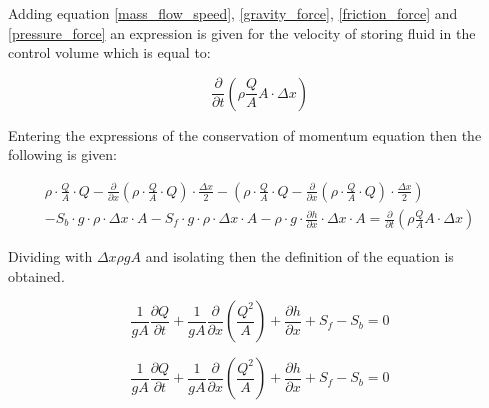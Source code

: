 Adding equation \ref{mass_flow_speed}, \ref{gravity_force}, \ref{friction_force} and \ref{pressure_force} an expression is given for the velocity of storing fluid in the control volume which is equal to:

\begin{equation}
\frac{\partial}{\partial t} (\rho \frac{Q}{A}A\cdot \Delta x)
\end{equation}

Entering the expressions of the conservation of momentum equation then the following is given:

\begin{equation}
\begin{array}{l}
\rho \cdot \frac{Q}{A} \cdot Q - \frac{\partial}{\partial x}(\rho \cdot \frac{Q}{A}  \cdot Q) \cdot \frac{\Delta x}{2} - \left(\rho \cdot \frac{Q}{A}  \cdot Q - \frac{\partial}{\partial x}(\rho \cdot \frac{Q}{A}  \cdot Q) \cdot \frac{\Delta x}{2} \right)\\
-S_b \cdot g \cdot \rho \cdot \Delta x \cdot A -S_f \cdot g \cdot \rho \cdot \Delta x \cdot A  -\rho\cdot g \cdot \frac{\partial h}{\partial x} \cdot \Delta x \cdot A =\frac{\partial}{\partial t} (\rho \frac{Q}{A}A\cdot \Delta x)
\end{array}
\end{equation}

Dividing with $\Delta x \rho g A$ and isolating then the definition of the equation is obtained.

\begin{equation}
\frac{1}{gA} \frac{\partial Q}{\partial t} +\frac{1}{gA}\frac{\partial}{\partial x} \left( \frac{Q^2}{A} \right) + \frac{\partial h}{\partial x} + S_f - S_b = 0
\label{saintbernard_momentum}
\end{equation}





\begin{equation}
\frac{1}{gA} \frac{\partial Q}{\partial t} +\frac{1}{gA}\frac{\partial}{\partial x} \left( \frac{Q^2}{A} \right) + \frac{\partial h}{\partial x} + S_f - S_b = 0
\label{saintbernard_momentum}
\end{equation}








